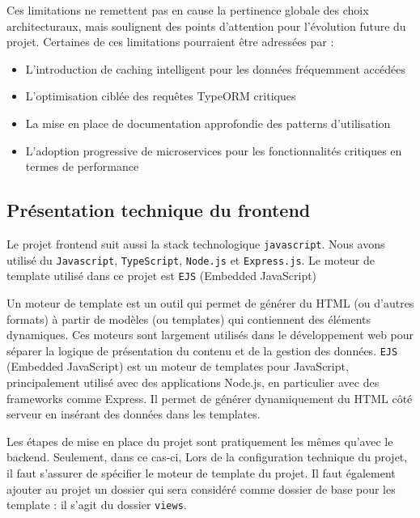 Ces limitations ne remettent pas en cause la pertinence globale des choix architecturaux, mais soulignent des points d'attention pour l'évolution future du projet. Certaines de ces limitations pourraient être adressées par :
\begin{itemize}
    \item L'introduction de caching intelligent pour les données fréquemment accédées
    \item L'optimisation ciblée des requêtes TypeORM critiques
    \item La mise en place de documentation approfondie des patterns d'utilisation
    \item L'adoption progressive de microservices pour les fonctionnalités critiques en termes de performance
\end{itemize}

\subsection*{Présentation technique du frontend}
Le projet frontend suit aussi la stack technologique \verb|javascript|. Nous avons utilisé du \verb|Javascript|, \verb|TypeScript|, \verb|Node.js| et \verb|Express.js|. Le moteur de template utilisé dans ce projet est \verb|EJS| (Embedded JavaScript)

\vspace{0.35cm}

Un moteur de template est un outil qui permet de générer du HTML (ou d'autres formats) à partir de modèles (ou templates) qui contiennent des éléments dynamiques. Ces moteurs sont largement utilisés dans le développement web pour séparer la logique de présentation du contenu et de la gestion des données. \verb|EJS| (Embedded JavaScript) est un moteur de templates pour JavaScript, principalement utilisé avec des applications Node.js, en particulier avec des frameworks comme Express. Il permet de générer dynamiquement du HTML côté serveur en insérant des données dans les templates.

\vspace{0.35cm}

Les étapes de mise en place du projet sont pratiquement les mêmes qu'avec le backend. Seulement, dans ce cas-ci, Lors de la configuration technique du projet, il faut s'assurer de spécifier le moteur de template du projet. Il faut également ajouter au projet un dossier qui sera considéré comme dossier de base pour les template : il s'agit du dossier \verb|views|. 

